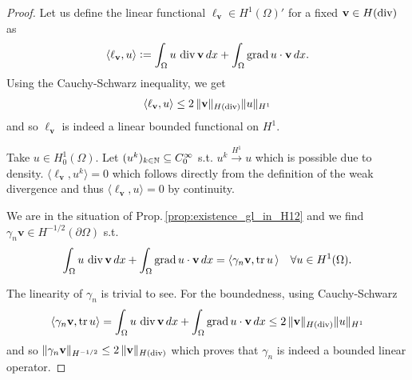 \documentclass[../master_thesis.tex]{subfiles}
\begin{document}
\begin{proof}
    Let us define 
    the linear functional $\ell_\mathbf{v} \in H^1(\Omega)'$ for a fixed $\mathbf{v} \in H(\operatorname{div})$
    as
    \begin{align*}
        \langle \ell_\mathbf{v}, u \rangle \vcentcolon= \int_\Omega u \, \operatorname{div} \mathbf{v} \, dx 
         + \int_\Omega \operatorname{grad} u \cdot \mathbf{v} \, dx.
    \end{align*}
    Using the Cauchy-Schwarz inequality, we get
    \begin{align*}
        \langle \ell_\mathbf{v}, u \rangle 
        \leq 2 \, \lVert \mathbf{v} \rVert _{H(\operatorname{div})} \lVert u \rVert _{H^1} 
    \end{align*}
    and so $\ell_\mathbf{v}$ is indeed a linear bounded functional on $H^1$.
    
    Take $u \in H^1_0(\Omega)$. 
    Let $(u^k)_{k\in \mathbb{N}} \subseteq C^\infty_0$ s.t. 
    $u^k \xrightarrow{H^1} u$ which is possible due to density. 
    $\langle \ell_\mathbf{v}, u^k \rangle  = 0$  which follows directly from the  
    definition of the weak divergence and thus $\langle \ell_\mathbf{v}, u \rangle = 0$
    by continuity.

    We are in the situation of Prop.\,\ref{prop:existence_gl_in_H12} 
    and we find $\gamma_n \mathbf{v} \in H^{-1/2}(\partial \Omega)$ 
    s.t. 
    \begin{align*}
        \int_\Omega u \, \operatorname{div} \mathbf{v} \, dx 
        + \int_\Omega \operatorname{grad} u \cdot \mathbf{v} \, dx 
        = \langle \gamma_n \mathbf{v}, \operatorname{tr} u \, \rangle \quad \forall u \in H^1(\Omega).
    \end{align*}
    
    The linearity of $\gamma_n$ is trivial to see.
    For the boundedness, using Cauchy-Schwarz 
    \begin{align*}
        \langle \gamma_n \mathbf{v}, \operatorname{tr} u \rangle 
        = \int_\Omega u \, \operatorname{div} \mathbf{v} \, dx 
            + \int_\Omega \operatorname{grad} u \cdot \mathbf{v} \, dx
        \leq 2 \, \lVert \mathbf{v} \rVert _{H(\operatorname{div})} \lVert u \rVert _{H^1}
    \end{align*}
    and so $\lVert \gamma_n \mathbf{v} \rVert _{H^{-1/2}} \leq 2 \,\lVert \mathbf{v} \rVert _{H(\operatorname{div})}$
    which proves that $\gamma_n$ is indeed a bounded linear operator.


\end{proof}
\end{document}
